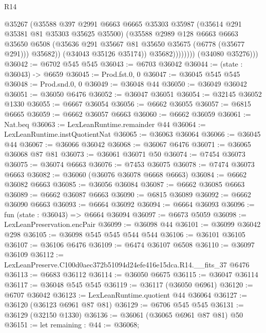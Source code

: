 \begin{lexlean}{R14}
\begin{coremodule}
                          @35267
                          (@35588
                            @397
                            @2991
                            @6663
                            @6665
                            @35303
                            @35987
                            (@35614 @291 @35381 @81 @35303 @35625 @35500)
                            (@35588
                              @2989
                              @128
                              @6663
                              @6663
                              @35650
                              @6508
                              (@35636 @291 @35667 @81 @35650 @35675 (@6778 (@35677 @291)))
                              @35682))
                          (@34043 @35126 @35174))
                        @35682))))))))
        (@34080 @35276)))
@36042 := @6702 @545 @545
@36043 := @6703 @36042
@36044 := (state : @36043) -> @6659
@36045 := Prod.fst.{0, 0}
@36047 := @36045 @545 @545
@36048 := Prod.snd.{0, 0}
@36049 := @36048 @44
@36050 := @36049 @36042
@36051 := @36050 @6476
@36052 := @36047 @36051
@36054 := @32145 @36052 @1330
@36055 := @6667 @36054
@36056 := @6662 @36055
@36057 := @6815 @6665
@36059 := @6662 @36057 @6663
@36060 := @6662 @36059
@36061 := Nat.beq
@36063 := LexLeanRuntime.remainder @44
@36064 := LexLeanRuntime.instQuotientNat
@36065 := @36063 @36064
@36066 := @36045 @44
@36067 := @36066 @36042
@36068 := @36067 @6476
@36071 := @36065 @36068 @87 @81
@36073 := @36061 @36071 @50
@36074 := @7454 @36073
@36075 := @36074 @6663
@36076 := @7453 @36075
@36078 := @7474 @36073 @6663
@36082 := @36060 (@36076 @36078 @6668 @6663)
@36084 := @6662 @36082 @6663
@36085 := @36056 @36084
@36087 := @6662 @36085 @6663
@36089 := @6662 @36087 @6663
@36090 := @6815 @36089
@36092 := @6662 @36090 @6663
@36093 := @6664 @36092
@36094 := @6664 @36093
@36096 := fun (state : @36043) => @6664 @36094
@36097 := @6673 @5059
@36098 := LexLeanPreservation.encPair
@36099 := @36098 @44
@36101 := @36099 @36042 @298
@36105 := @36098 @545 @545 @544 @544
@36106 := @36101 @36105
@36107 := @36106 @6476
@36109 := @6474 @36107 @6508
@36110 := @36097 @36109
@36112 := LexLeanPreserve.C100d0aec372b51094d24efe416e15dca.R14.__fits_37 @6476
@36113 := @6683 @36112
@36114 := @36050 @6675
@36115 := @36047 @36114
@36117 := @36048 @545 @545
@36119 := @36117 (@36050 @6961)
@36120 := @6707 @36042
@36123 := LexLeanRuntime.quotient @44 @36064
@36127 := @36120 (@36123 @6961 @87 @81)
@36129 := @6706 @545 @545
@36131 := @36129 (@32150 @1330)
@36136 := @36061 (@36065 @6961 @87 @81) @50
@36151 := let remaining : @44 := @36068;

\end{coremodule}
\end{lexlean}
